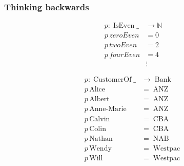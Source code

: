 \documentclass[
xcolor={usenames,dvipsnames,svgnames},
]{beamer}
\DeclareMathOperator{\ANZ}{ANZ}
\DeclareMathOperator{\NAB}{NAB}
\DeclareMathOperator{\CBA}{CBA}
\DeclareMathOperator{\Westpac}{Westpac}
\DeclareMathOperator{\Bank}{Bank}
\DeclareMathOperator{\IsEven}{IsEven}
\DeclareMathOperator{\CustomerOf}{CustomerOf}
\newcommand{\N}{\ensuremath{\mathbb{N}}}
\begin{document}
  \begin{frame}
    \frametitle{Thinking backwards}
    \begin{minipage}{.5\textwidth}
      \begin{align*}
        p : \IsEven \_  &\to \N\\
        p \, zeroEven &= 0 \\
        p \, twoEven &= 2 \\
        p \, fourEven &= 4 \\
        &\vdots
      \end{align*}

    \end{minipage}%
    \begin{minipage}{.5\textwidth}
      \begin{align*}
        p : \CustomerOf \_       &\to \Bank\\
        p \, \textrm{Alice}      &= \ANZ \\
        p \, \textrm{Albert}     &= \ANZ \\
        p \, \textrm{Anne-Marie} &= \ANZ \\
        p \, \textrm{Calvin}     &= \CBA \\
        p \, \textrm{Colin}      &= \CBA \\
        p \, \textrm{Nathan}     &= \NAB \\
        p \, \textrm{Wendy}      &= \Westpac \\
        p \, \textrm{Will}       &= \Westpac \\
      \end{align*}
    \end{minipage}
  \end{frame}
\end{document}
